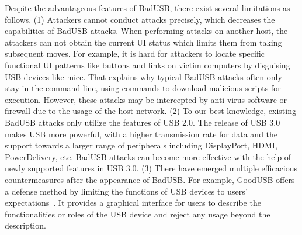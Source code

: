 Despite the advantageous features of BadUSB, there exist several limitations as
follows.  (1) Attackers cannot conduct attacks precisely, which decreases the
capabilities of BadUSB attacks.  When performing attacks on another host, the
attackers can not obtain the current \ac{UI} status which limits
them from taking subsequent moves.  For example, it is hard for attackers to
locate specific functional \ac{UI} patterns like buttons and links on victim
computers by disguising \ac{USB} devices like mice.  That explains why typical
BadUSB attacks often only stay in the command line, using commands to download
malicious scripts for execution.  However, these attacks may be intercepted by
anti-virus software or firewall due to the usage of the host network.  (2) To
our best knowledge, existing BadUSB attacks only utilize the features of \ac{USB}
2.0.  The release of \ac{USB} 3.0 makes \ac{USB} more powerful, with a higher
transmission rate for data and the support towards a larger range of
peripherals including DisplayPort, HDMI, PowerDelivery, etc.  BadUSB attacks
can become more effective with the help of newly supported features in \ac{USB} 3.0.
(3) There have emerged multiple efficacious countermeasures after the
appearance of BadUSB.  For example, GoodUSB offers a defense method by limiting
the functions of \ac{USB} devices to users' expectations~\cite{tian2015defending}.
It provides a graphical interface for users to describe the functionalities or
roles of the \ac{USB} device and reject any usage beyond the description.

